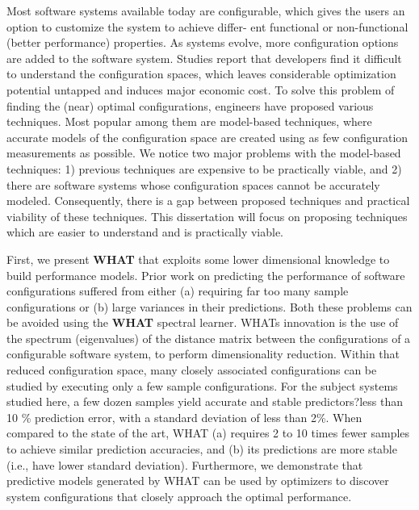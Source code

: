 Most software systems available today are configurable, which gives the users an option to customize the system to achieve differ-
ent functional or non-functional (better performance) properties. As systems evolve, more configuration options are added to the
software system. Studies report that developers find it difficult to
understand the configuration spaces, which leaves considerable
optimization potential untapped and induces major economic cost.
To solve this problem of finding the (near) optimal configurations,
engineers have proposed various techniques. Most popular among
them are model-based techniques, where accurate models of the configuration space are created using as few configuration measurements as possible. We notice two major problems with the model-based techniques: 1) previous techniques are expensive to be practically viable, and 2) there are software systems whose configuration spaces cannot be accurately modeled. Consequently, there is
a gap between proposed techniques and practical viability of these
techniques.
This dissertation will focus on proposing techniques which are
easier to understand and is practically viable. 

First, we present \textbf{WHAT} that exploits
some lower dimensional knowledge to build performance models. Prior work on
predicting the performance of software configurations suffered from either (a) requiring
far too many sample configurations or (b) large variances in their predictions.
Both these problems can be avoided using the \textbf{WHAT} spectral learner. WHAT\textquotesingle s innovation
is the use of the spectrum (eigenvalues) of the distance matrix between the
configurations of a configurable software system, to perform dimensionality reduction.
Within that reduced configuration space, many closely associated configurations
can be studied by executing only a few sample configurations. For the subject systems
studied here, a few dozen samples yield accurate and stable predictors?less than
10 \% prediction error, with a standard deviation of less than 2\%. When compared
to the state of the art, WHAT (a) requires 2 to 10 times fewer samples to achieve
similar prediction accuracies, and (b) its predictions are more stable (i.e., have lower
standard deviation). Furthermore, we demonstrate that predictive models generated
by WHAT can be used by optimizers to discover system configurations that closely
approach the optimal performance.


